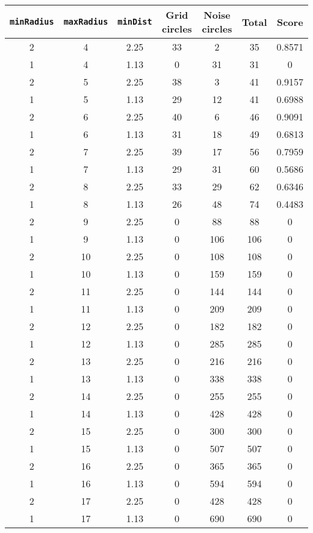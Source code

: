 \documentclass[letterpaper, 12pt]{article}
\begin{document}
\begin{longtable}{|c|c|c|c|c|c|c|}
\hline
\textbf{\texttt{minRadius}} & \textbf{\texttt{maxRadius}} & \textbf{\texttt{minDist}} & \textbf{Grid circles} & \textbf{Noise circles} & \textbf{Total} & \textbf{Score} \\
\hline
2 & 4 & 2.25 & 33 & 2 & 35 & 0.8571 \\
\hline
1 & 4 & 1.13 & 0 & 31 & 31 & 0 \\
\hline
2 & 5 & 2.25 & 38 & 3 & 41 & 0.9157 \\
\hline
1 & 5 & 1.13 & 29 & 12 & 41 & 0.6988 \\
\hline
2 & 6 & 2.25 & 40 & 6 & 46 & 0.9091 \\
\hline
1 & 6 & 1.13 & 31 & 18 & 49 & 0.6813 \\
\hline
2 & 7 & 2.25 & 39 & 17 & 56 & 0.7959 \\
\hline
1 & 7 & 1.13 & 29 & 31 & 60 & 0.5686 \\
\hline
2 & 8 & 2.25 & 33 & 29 & 62 & 0.6346 \\
\hline
1 & 8 & 1.13 & 26 & 48 & 74 & 0.4483 \\
\hline
2 & 9 & 2.25 & 0 & 88 & 88 & 0 \\
\hline
1 & 9 & 1.13 & 0 & 106 & 106 & 0 \\
\hline
2 & 10 & 2.25 & 0 & 108 & 108 & 0 \\
\hline
1 & 10 & 1.13 & 0 & 159 & 159 & 0 \\
\hline
2 & 11 & 2.25 & 0 & 144 & 144 & 0 \\
\hline
1 & 11 & 1.13 & 0 & 209 & 209 & 0 \\
\hline
2 & 12 & 2.25 & 0 & 182 & 182 & 0 \\
\hline
1 & 12 & 1.13 & 0 & 285 & 285 & 0 \\
\hline
2 & 13 & 2.25 & 0 & 216 & 216 & 0 \\
\hline
1 & 13 & 1.13 & 0 & 338 & 338 & 0 \\
\hline
2 & 14 & 2.25 & 0 & 255 & 255 & 0 \\
\hline
1 & 14 & 1.13 & 0 & 428 & 428 & 0 \\
\hline
2 & 15 & 2.25 & 0 & 300 & 300 & 0 \\
\hline
1 & 15 & 1.13 & 0 & 507 & 507 & 0 \\
\hline
2 & 16 & 2.25 & 0 & 365 & 365 & 0 \\
\hline
1 & 16 & 1.13 & 0 & 594 & 594 & 0 \\
\hline
2 & 17 & 2.25 & 0 & 428 & 428 & 0 \\
\hline
1 & 17 & 1.13 & 0 & 690 & 690 & 0 \\

\end{longtable}
\end{document}
